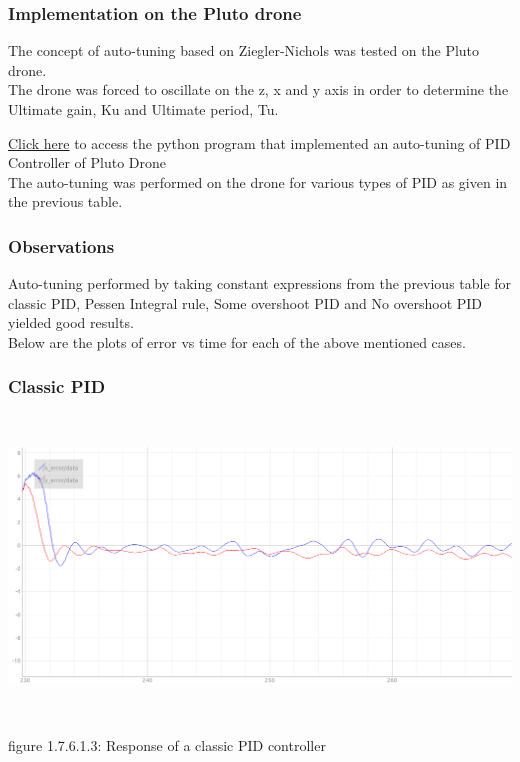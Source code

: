 \documentclass[a4paper,12pt,oneside]{book}
\begin{document}
\subsubsection{Implementation on the Pluto drone}
The concept of auto-tuning based on Ziegler-Nichols was tested on the Pluto drone.\\
The drone was forced to oscillate on the z, x and y axis in order to determine the Ultimate gain, Ku and Ultimate period, Tu.

\href{https://github.com/eYSIP-2018/Autotuning-of-Controller-For-Drone/blob/6a7bdb9e7e259bd5313f333f7c46013b20c9bdca/auto-tuning-doc.py}{Click here} {to access the python program that implemented an auto-tuning of PID Controller of Pluto Drone} \\
The auto-tuning was performed on the drone for various types of PID as given in the previous table.

\subsubsection{Observations}
Auto-tuning performed by taking constant expressions from the previous table for classic PID, Pessen Integral rule, Some overshoot PID and No overshoot PID yielded good results.\\
Below are the plots of error vs time for each of the above mentioned cases.
 \subsubsection{Classic PID}
 \begin{flushleft}
\includegraphics[width = 15cm , height= 8cm]{extra-1.png}
\end{flushleft}
\begin{center}
    figure 1.7.6.1.3: Response of a classic PID controller
\end{center}
\end{document}
